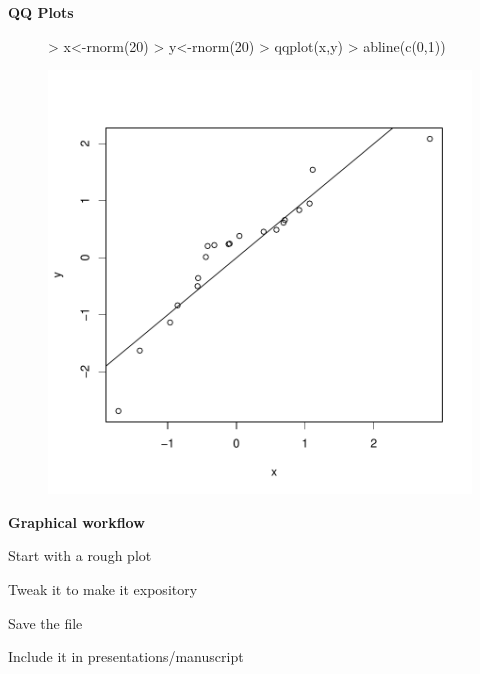\documentclass[xcolor=dvipsnames]{beamer}
\begin{document}
\begin{frame}[fragile]{\textbf{QQ Plots}}

\begin{center}
\begin{figure}
\centering
\begin{Schunk}
\begin{Sinput}
> x<-rnorm(20)
> y<-rnorm(20)
> qqplot(x,y)
> abline(c(0,1))
\end{Sinput}
\end{Schunk}
\includegraphics{lesson3_graphs_presentation-008}
\end{figure}
\end{center}

\end{frame}

\begin{frame}{\textbf{Graphical workflow}}

\begin{itemize}
\begin{pause}
\item{Start with a rough plot}
\end{pause}
\begin{pause}
\item{Tweak it to make it expository}
\end{pause}
\begin{pause}
\item{Save the file}
\end{pause}
\begin{pause}
\item{Include it in presentations/manuscript}
\end{pause}
\end{itemize}
\end{frame}
\end{document}

